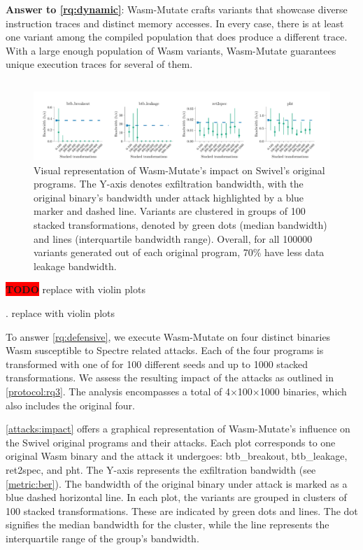 \documentclass[sigplan,screen]{acmart}
\newcommand*\badge[1]{ \colorbox{red}{\color{white}#1}}
\newcommand{\tool}{{\sc Wasm-Mutate}\xspace}
\newcommand{\wasm}{Wasm\xspace}
\newcommand{\todo}[1]{%
\refstepcounter{todo}
\noindent\textbf{\badge{TODO}} {\color{red}#1}
\addcontentsline{td}{todo}
{\color{red}\thesection.\thetodo\xspace #1}}
\begin{document}
\begin{tcolorbox}[boxrule=1pt,arc=.3em,boxsep=-1.3mm]
  \textbf{Answer to \ref{rq:dynamic}}:   \tool crafts variants that showcase diverse instruction traces and distinct memory accesses. 
  In every case, there is at least one variant among the compiled population that does produce a different trace. 
  With a large enough population of \wasm variants, \tool guarantees unique execution traces for several of them. 
\end{tcolorbox}


\subsection{\rqdefensive}



\begin{figure}
    \centering
    \includegraphics[width=\linewidth]{plots/rq3/results.rq3.pdf}
    \caption{Visual representation of \tool's impact on Swivel's original programs. The Y-axis denotes exfiltration bandwidth, with the original binary's bandwidth under attack highlighted by a blue marker and dashed line. Variants are clustered in groups of 100 stacked transformations, denoted by green dots (median bandwidth) and lines (interquartile bandwidth range). Overall, for all 100000 variants generated out of each original program, 70\% have less data leakage bandwidth.}
  \label{attacks:impact}
\end{figure}
\todo{replace with violin plots}

To answer \ref{rq:defensive}, we execute \tool on four distinct binaries \wasm susceptible to Spectre related attacks. Each of the four programs is transformed with one of for 100 different seeds and up to 1000 stacked transformations. 
We assess the resulting impact of the attacks as outlined in \ref{protocol:rq3}. 
The  analysis encompasses a total of 4$\times$100$\times$1000 binaries, which also includes the original four.

\autoref{attacks:impact} offers a graphical representation of \tool's influence on the Swivel original programs and their attacks. 
Each plot corresponds to one original \wasm binary and the attack it undergoes: btb\_breakout, btb\_leakage, ret2spec, and pht.
The Y-axis represents the exfiltration bandwidth (see \autoref{metric:ber}). 
The bandwidth of the original binary under attack is marked as a blue dashed horizontal line.
In each plot, the variants are grouped in clusters of 100 stacked transformations. 
These are indicated by green dots and lines. 
The dot signifies the median bandwidth for the cluster, while the line represents the interquartile range of the group's bandwidth.
\end{document}
